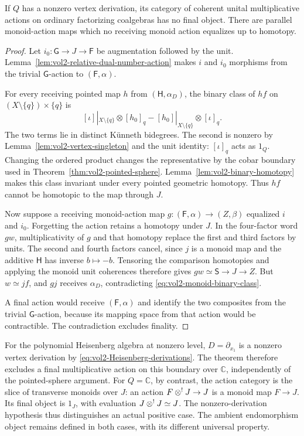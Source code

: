 \begin{theorem}\label{thm:vol2-monoid-nonfinality}
If $Q$ has a nonzero vertex derivation, its category of coherent
unital multiplicative actions on ordinary factorizing coalgebras
has no final object. There are parallel monoid-action maps
which no receiving monoid action equalizes up to homotopy.
\end{theorem}
\begin{proof}
Let $i_0:\mathsf G\to J\to\mathsf F$ be augmentation followed
by the unit. Lemma~\ref{lem:vol2-relative-dual-number-action}
makes $i$ and $i_0$ morphisms from the trivial $\mathsf G$-action
to $(\mathsf F,\alpha)$.

For every receiving pointed map $h$ from $(\mathsf H,\alpha_D)$,
the binary class of $hf$ on $(X\setminus\{q\})\times\{q\}$ is
\begin{equation}\label{eq:vol2-monoid-binary-class}
 [\iota]|_{X\setminus\{q\}}\otimes[h_0]_q
       -[h_0]|_{X\setminus\{q\}}\otimes[\iota]_q.
\end{equation}
The two terms lie in distinct K\"unneth bidegrees. The second
is nonzero by Lemma~\ref{lem:vol2-vertex-singleton} and the unit
identity: $[\iota]_q$ acts as $1_Q$.
Changing the ordered product changes the representative by the
cobar boundary used in Theorem~\ref{thm:vol2-pointed-sphere}.
Lemma~\ref{lem:vol2-binary-homotopy} makes this class invariant
under every pointed geometric homotopy. Thus $hf$ cannot be
homotopic to the map through $J$.

Now suppose a receiving monoid-action map
$g:(\mathsf F,\alpha)\to(Z,\beta)$ equalized $i$ and $i_0$.
Forgetting the action retains a homotopy under $J$. In the
four-factor word $gw$, multiplicativity of $g$ and that
homotopy replace the first and third factors by units.
The second and fourth factors cancel, since $j$ is a monoid map
and the additive $\mathsf H$ has inverse $b\mapsto-b$.
Tensoring the comparison homotopies and applying the monoid unit
coherences therefore gives $gw\simeq\mathsf S\to J\to Z$.
But $w\simeq jf$, and $gj$ receives $\alpha_D$, contradicting
\eqref{eq:vol2-monoid-binary-class}.

A final action would receive $(\mathsf F,\alpha)$ and identify
the two composites from the trivial $\mathsf G$-action, because
its mapping space from that action would be contractible.
The contradiction excludes finality.
\end{proof}

For the polynomial Heisenberg algebra at nonzero level,
$D=\partial_{x_1}$ is a nonzero vertex derivation by
\eqref{eq:vol2-Heisenberg-derivations}. The theorem therefore
excludes a final multiplicative action on this boundary over
$\mathbb C$, independently of the pointed-sphere argument.
For $Q=\mathbb C$, by contrast, the action category is the
slice of transverse monoids over $J$: an action
$F\mathbin{\otimes^!} J\to J$ is a monoid map $F\to J$.
Its final object is $1_J$, with evaluation $J\mathbin{\otimes^!} J\simeq J$.
The nonzero-derivation hypothesis thus distinguishes an actual
positive case. The ambient endomorphism object remains defined
in both cases, with its different universal property.

